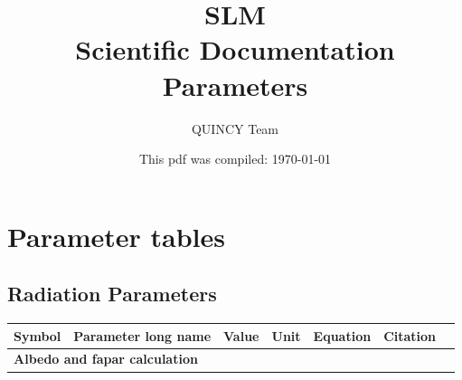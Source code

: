 \documentclass[11pt,oneside,openright,a4paper,fleqn]{book}  %
\begin{document}
\title{%
  \textbf{SLM}\\
  \large Scientific Documentation Parameters}
\author{QUINCY Team}
\date{This pdf was compiled: \today}
\maketitle


\newpage
\mbox{}

\tableofcontents



\chapter{Parameter tables}\label{ch:param}


\begin{table}
\section{Radiation Parameters}\label{tab:rad:param}


\begin{tabularx}{\linewidth}{|c|X|l|l|c|l|c|} %
\hline 
Symbol & Parameter long name & Value & Unit & Equation & Citation \\
\hline 

\multicolumn{6}{l}{\bf Albedo and fapar calculation}\\
\hline


\end{tabularx}
\end{table}
\end{document}

